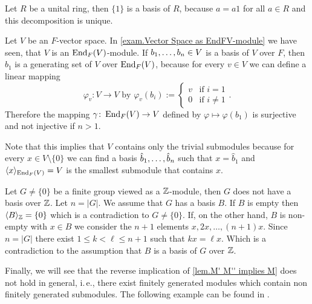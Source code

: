 \begin{exam}\label{exam.Bases of Modules}
\begin{exlist}
\item Let $R$ be a unital ring, then $\lbrace 1\rbrace$ is a basis of $R$, because $a=a1$ for all $a\in R$ and this decomposition is unique.
\item Let $V$ be an $F$-vector space. In \cref{exam.Vector Space as EndFV-module} we have seen, that $V$ is an $\operatorname{\mathrm{End}}_F(V)$-module. If $b_{1},\ldots,b_{n}\in V$ is a basis of $V$ over $F$, then $b_1$ is a generating set of $V$ over $\operatorname{\mathrm{End}}_F(V)$, because for every $v\in V$ we can define a linear mapping 
\begin{equation*}
\varphi_v\colon V\to V \text{ by } \varphi_v(b_i):= \begin{cases}v & \text{if } i=1\\ 0 & \text{if } i\neq 1\end{cases}.
\end{equation*}
Therefore the mapping $\gamma\colon \operatorname{\mathrm{End}}_F(V)\to V$ defined by $\varphi\mapsto \varphi(b_1)$ is surjective and not injective if $n>1$.

Note that this implies that $V$ contains only the trivial submodules because for every $x\in V\setminus\lbrace 0\rbrace$ we can find a basis $\hat{b}_{1},\ldots,\hat{b}_{n}$ such that $x=\hat{b}_1$ and $\langle x\rangle_{\operatorname{\mathrm{End}}_F(V)}=V$ is the smallest submodule that contains $x$. \label{exam. Generating set of V over EndFV}
\item Let $G\neq\lbrace 0\rbrace$ be a finite group viewed as a $\operatorname{\mathbb{Z}}$-module, then $G$ does not have a basis over $\operatorname{\mathbb{Z}}$. Let $n=|G|$. We assume that $G$ has a basis $B$. If $B$ is empty then $\langle B\rangle_{\operatorname{\mathbb{Z}}} =\lbrace 0\rbrace$ which is a contradiction to $G\neq\lbrace 0\rbrace$. If, on the other hand, $B$ is non-empty with $x\in B$ we consider the $n+1$ elements $x,2x,\ldots,(n+1)x$. Since $n=| G|$ there exist $1\leq k<\ell\leq n+1$ such that $kx=\ell x$. Which is a contradiction to the assumption that $B$ is a basis of $G$ over $\operatorname{\mathbb{Z}}$.\label{exam.basis of G}
\end{exlist}
\end{exam}

Finally, we will see that the reverse implication of \cref{lem.M' M'' implies M} does not hold in general, i.\,e., there exist finitely generated modules which contain non finitely generated submodules. The following example can be found in \cite[p.197]{jantzen2005algebra}.


